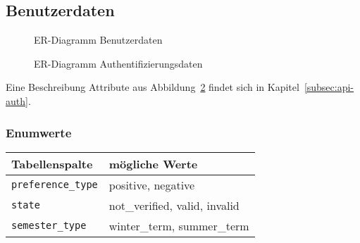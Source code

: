 \subsection{Benutzerdaten}
\begin{figure}[H]
	
	\caption{ER-Diagramm Benutzerdaten}
	\label{fig:user-er}
\end{figure}
\begin{figure}[H]
	
	\caption{ER-Diagramm Authentifizierungsdaten}
	\label{fig:auth-er}
\end{figure}

Eine Beschreibung Attribute aus Abbildung~\ref{fig:auth-er} findet sich in Kapitel~\ref{subsec:api-auth}.
\subsubsection{Enumwerte}
\begin{table}[h]
	\begin{tabular}{|l|l|}
		\hline
		\textbf{Tabellenspalte} & \textbf{mögliche Werte} \\ \hline
		\texttt{preference\_type} & positive, negative \\ \hline
		\texttt{state} & not\_verified, valid, invalid \\ \hline
		\texttt{semester\_type} & winter\_term, summer\_term \\ \hline
	\end{tabular}
\end{table}